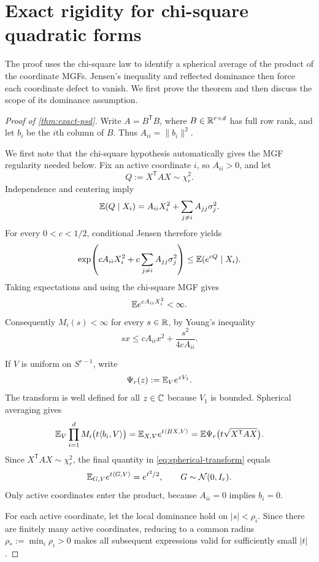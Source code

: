 \section{Exact rigidity for chi-square quadratic forms}\label{sec:exact}

The proof uses the chi-square law to identify a spherical average of the product of the coordinate MGFs. Jensen's inequality and reflected dominance then force each coordinate defect to vanish. We first prove the theorem and then discuss the scope of its dominance assumption.

\begin{proof}[Proof of \cref{thm:exact-psd}]
Write $A=B^{\mathsf T}B$, where $B\in\mathbb R^{r\times d}$ has full row rank, and let $b_i$ be the $i$th column of $B$. Thus $A_{ii}=\|b_i\|^2$.

We first note that the chi-square hypothesis automatically gives the MGF regularity needed below. Fix an active coordinate $i$, so $A_{ii}>0$, and let
\[
Q:=X^{\mathsf T}AX\sim\chi_r^2.
\]
Independence and centering imply
\[
\mathbb E(Q\mid X_i)=A_{ii}X_i^2+\sum_{j\ne i}A_{jj}\sigma_j^2.
\]
For every $0<c<1/2$, conditional Jensen therefore yields
\[
\exp\!\left(cA_{ii}X_i^2+c\sum_{j\ne i}A_{jj}\sigma_j^2\right)
\le \mathbb E(e^{cQ}\mid X_i).
\]
Taking expectations and using the chi-square MGF gives
\begin{equation}\label{eq:auto-square-exp}
\mathbb E e^{cA_{ii}X_i^2}<\infty.
\end{equation}
Consequently $M_i(s)<\infty$ for every $s\in\mathbb R$, by Young's inequality
\[
sx\le cA_{ii}x^2+\frac{s^2}{4cA_{ii}}.
\]

If $V$ is uniform on $S^{r-1}$, write
\[
\Psi_r(z):=\mathbb E_V e^{zV_1}.
\]
The transform is well defined for all $z\in\mathbb C$ because $V_1$ is bounded. Spherical averaging gives
\begin{equation}\label{eq:spherical-transform}
\mathbb E_V\prod_{i=1}^d M_i\bigl(t\langle b_i,V\rangle\bigr)
 =\mathbb E_{X,V}e^{t\langle BX,V\rangle}
 =\mathbb E\Psi_r\bigl(t\sqrt{X^{\mathsf T}AX}\bigr).
\end{equation}
Since $X^{\mathsf T}AX\sim\chi_r^2$, the final quantity in \eqref{eq:spherical-transform} equals
\begin{equation}\label{eq:spherical-gaussian}
\mathbb E_{G,V}e^{t\langle G,V\rangle}=e^{t^2/2},
\qquad G\sim\mathcal N(0,I_r).
\end{equation}
Only active coordinates enter the product, because $A_{ii}=0$ implies $b_i=0$.

For each active coordinate, let the local dominance hold on $|s|<\rho_i$. Since there are finitely many active coordinates, reducing to a common radius $\rho_*:=\min_i\rho_i>0$ makes all subsequent expressions valid for sufficiently small $|t|$.


\end{proof}
